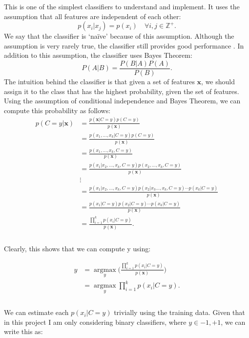 \documentclass[12pt,a4paper,twoside,openright]{report}
\begin{document}
This is one of the simplest classifiers to understand and implement. It uses the assumption that all features are independent of each other:
\begin{equation}
	p(x_i | x_j) = p(x_i) \quad \forall i, j \in \mathbb{Z}^+.
\end{equation}
We say that the classifier is `na\"{i}ve' because of this assumption. Although the assumption is very rarely true, the classifier still provides good performance \cite{ml_book_murphy}.
\newline
\newline
In addition to this assumption, the classifier uses Bayes Theorem:
\begin{equation}
	P(A | B) = \frac{P(B | A)P(A)}{P(B)}.
\end{equation}
The intuition behind the classifier is that given a set of features $\mathbf{x}$, we should assign it to the class that has the highest probability, given the set of features. Using the assumption of conditional independence and Bayes Theorem, we can compute this probability as follows:
\begin{equation}
\begin{aligned}
p(C = y | \mathbf{x}) &= \frac{p(\mathbf{x} | C = y)p(C = y)}{p(\mathbf{x})} \\
&= \frac{p(x_1, \ldots, x_k | C = y)p(C = y)}{p(\mathbf{x})} \\
&= \frac{p(x_1, \ldots, x_k, C = y)}{p(\mathbf{x})} \\
&= \frac{p(x_1 | x_2, \ldots, x_k, C = y)p(x_2, \ldots, x_k, C = y)}{p(\mathbf{x})} \\
& \vdots \\
&= \frac{p(x_1 | x_2, \ldots, x_k, C = y)p(x_2 | x_3 \ldots, x_k, C = y)\cdots p(x_k | C = y)}{p(\mathbf{x})} \\
&= \frac{p(x_1 | C = y)p(x_2 | C = y) \cdots p(x_k | C = y)}{p(\mathbf{x})} \\
&= \frac{\prod_{i = 1}^{k}p(x_i | C = y)}{p(\mathbf{x})}. \\
\end{aligned}
\end{equation}
\\
Clearly, this shows that we can compute y using:

\begin{equation}
\begin{aligned}
y &= \underset{y}{\operatorname{argmax}}\bigg(\frac{\prod_{i = 1}^{k}p(x_i | C = y)}{p(\mathbf{x})}\bigg) \\
&= \underset{y}{\operatorname{argmax}} \displaystyle \prod_{i = 1}^{k}p(x_i | C = y). \\
\end{aligned}
\end{equation}
\\
We can estimate each $p(x_i | C = y)$ trivially using the training data. Given that in this project I am only considering binary classifiers, where $y \in {-1, +1}$, we can write this as:
\end{document}
